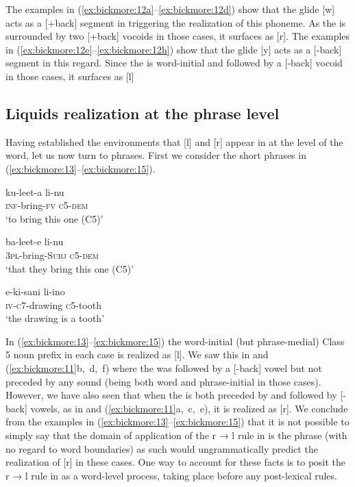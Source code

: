 \documentclass[output=paper,modfonts,nonflat,
 hidelinks
]{langsci/langscibook}
\begin{document}
The examples in (\ref{ex:bickmore:12a}--\ref{ex:bickmore:12d}) show that the glide [w] acts as a [+back] segment in triggering the realization of this  phoneme. As the  is surrounded by two [+back] vocoids in those cases, it surfaces as [r]. The examples in (\ref{ex:bickmore:12e}--\ref{ex:bickmore:12h}) show that the glide [y] acts as a [-back] segment in this regard. Since the  is word-initial and followed by a [-back] vocoid in those cases, it surfaces as [l]

\subsection{Liquids realization at the phrase level}

Having established the environments that [l] and [r] appear in at the level of the word, let us now turn to phrases. First we consider the short phrases in (\ref{ex:bickmore:13}--\ref{ex:bickmore:15}).

\ea\label{ex:bickmore:13}
\gll  ku-leet-a li-nu  \\
\textsc{inf-}\textup{bring}\textsc{{}-fv} \textsc{c5-dem}\\
\glt  ‘to bring this one (C5)’  
\z

\ea\label{ex:bickmore:14}
\gll  ba-leet-e li-nu  \\
\textsc{3pl-}\textup{bring}\textsc{{}-Subj} \textsc{c5-dem}\\
\glt  ‘that they bring this one (C5)’
\z

\ea\label{ex:bickmore:15}
\gll  e-ki-sani li-ino  \\
\textsc{iv-c7-}\textup{drawing} \textsc{c5-}\textup{tooth}\\
\glt  ‘the drawing is a tooth’    
\z

In (\ref{ex:bickmore:13}--\ref{ex:bickmore:15}) the word-initial (but phrase-medial) Class 5 noun prefix in each case is realized as [l]. We saw this in  and (\ref{ex:bickmore:11}b,~d,~f) where the  was followed by a [-back] vowel but not preceded by any sound (being both word and phrase-initial in those cases). However, we have also seen that when the  is both preceded by and followed by [-back] vowels, as in  and (\ref{ex:bickmore:11}a,~c,~e), it is realized as [r]. We conclude from the examples in (\ref{ex:bickmore:13}--\ref{ex:bickmore:15}) that it is not possible to simply say that the domain of application of the r → l rule in  is the phrase (with no regard to word boundaries) as such would ungrammatically predict the realization of [r] in these cases. One way to account for these facts is to posit the r → l rule in  as a word-level process, taking place before any post-lexical rules. 
\end{document}
